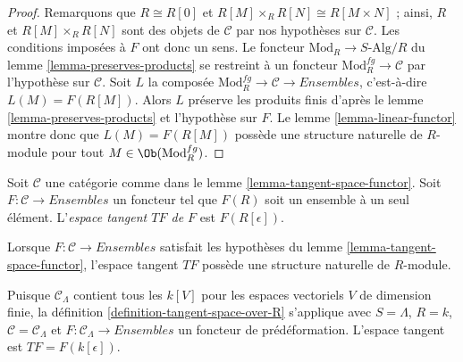 \begin{proof}
Remarquons que $R \cong R[0]$ et
$R[M] \times_R R[N] \cong R[M \times N]$ ; ainsi, $R$ et
$R[M] \times_R R[N]$ sont des objets de $\mathcal{C}$ par nos hypothèses sur
$\mathcal{C}$. Les conditions imposées à $F$ ont donc un sens. Le foncteur
$\text{Mod}_R \to S\text{-Alg}/R$ du lemme \ref{lemma-preserves-products} se
restreint à un foncteur $\text{Mod}^{fg}_R \to \mathcal{C}$ par l'hypothèse
sur $\mathcal{C}$. Soit $L$ la composée
$\text{Mod}^{fg}_R \to \mathcal{C} \to \textit{Ensembles}$, c'est-à-dire
$L(M) = F(R[M])$. Alors $L$ préserve les produits finis d'après le lemme
\ref{lemma-preserves-products} et l'hypothèse sur $F$. Le lemme
\ref{lemma-linear-functor} montre donc que $L(M) = F(R[M])$ possède une
structure naturelle de $R$-module pour tout
$M \in \Ob(\text{Mod}^{fg}_R)$.
\end{proof}

\begin{definition}
\label{definition-tangent-space-over-R}
Soit $\mathcal{C}$ une catégorie comme dans le lemme
\ref{lemma-tangent-space-functor}. Soit
$F : \mathcal{C} \to \textit{Ensembles}$ un foncteur tel que $F(R)$ soit un
ensemble à un seul élément. L'{\it espace tangent $TF$ de $F$} est $F(R[\epsilon])$.
\end{definition}

\noindent
Lorsque $F : \mathcal{C} \to \textit{Ensembles}$ satisfait les hypothèses du
lemme \ref{lemma-tangent-space-functor}, l'espace tangent $TF$ possède une
structure naturelle de $R$-module.

\begin{example}
\label{example-tangent-space-functor}
Puisque $\mathcal{C}_\Lambda$ contient tous les $k[V]$ pour les espaces
vectoriels $V$ de dimension finie, la définition
\ref{definition-tangent-space-over-R} s'applique avec $S = \Lambda$, $R = k$,
$\mathcal{C} = \mathcal{C}_\Lambda$ et
$F : \mathcal{C}_\Lambda \to \textit{Ensembles}$ un foncteur de prédéformation.
L'espace tangent est $TF = F(k[\epsilon])$.
\end{example}

